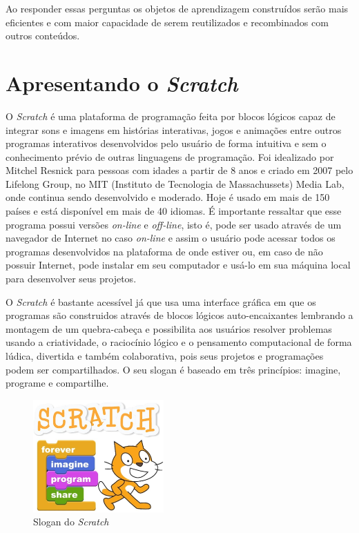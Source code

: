 \documentclass[12pt, openright, a4paper, brazil, english, french, spanish, bibjustif, openany, oneside]{abntex2}
\begin{document}
Ao responder essas perguntas os objetos de aprendizagem construídos serão mais eficientes e com maior capacidade de serem reutilizados e recombinados com outros conteúdos.


\chapter{Apresentando o \textit{Scratch}}

 O \textit{Scratch} é uma plataforma de programação feita por blocos lógicos capaz de integrar sons e imagens em histórias interativas, jogos e animações entre outros programas interativos desenvolvidos pelo usuário de forma intuitiva e sem o conhecimento prévio de outras linguagens de programação. Foi idealizado por Mitchel Resnick para pessoas com idades a partir de 8 anos e criado em 2007 pelo Lifelong Group, no MIT (Instituto de Tecnologia de Massachussets) Media Lab, onde continua sendo desenvolvido e moderado.  Hoje é usado em mais de 150 países e está disponível em mais de 40 idiomas. É importante ressaltar que esse programa possui versões \textit{on-line} e \textit{off-line}, isto é, pode ser usado através de um navegador de Internet no caso \textit{on-line} e assim o usuário pode acessar todos os programas desenvolvidos na plataforma de onde estiver ou, em caso de não possuir Internet, pode instalar em seu computador e usá-lo em sua máquina local para desenvolver seus projetos.
 
 O \textit{Scratch} é bastante acessível já que usa uma interface gráfica em que os programas são construidos através de blocos lógicos auto-encaixantes lembrando a montagem de um quebra-cabeça e possibilita aos usuários resolver problemas usando a criatividade, o raciocínio lógico e o pensamento computacional de forma lúdica, divertida e também colaborativa, pois seus projetos e programações podem ser compartilhados. O seu slogan é baseado em três princípios: imagine, programe e compartilhe.
 
\begin{figure}[h]

    \center
    \caption{Slogan do \textit{Scratch} \label{logoscr1}}
    \includegraphics[width=5cm]{logoscratch.png}
    
\end{figure} 
\end{document}
